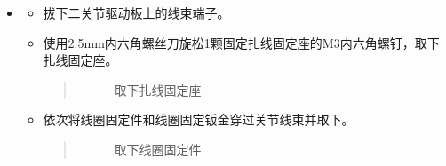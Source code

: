 \documentclass[a4paper,11pt,english,openany,oneside]{sphinxmanual}
\begin{document}
\begin{itemize}
\begin{itemize}
\begin{quote}
\begin{figure}[H]
\noindent{}
\caption{旋松一关节螺钉}\label{\detokenize{_u66f4_u6362_u5173_u8282:id38}}\end{figure}
\end{quote}

\item {} 
\sphinxAtStartPar
缓慢将二关节取下，同时将线束从一关节的出线孔逐一抽出，为防止线束端子卡住，推荐先抽出电源线，再抽出EtherCAT线。
\begin{quote}

\begin{figure}[H]
\centering
\capstart

\noindent{}
\caption{分离二关节}\label{\detokenize{_u66f4_u6362_u5173_u8282:id39}}\end{figure}
\end{quote}

\end{itemize}

\item {} 
\sphinxAtStartPar
{}
\begin{itemize}
\item {} 
\sphinxAtStartPar
拔下二关节驱动板上的线束端子。

\item {} 
\sphinxAtStartPar
使用2.5mm内六角螺丝刀旋松1颗固定扎线固定座的M3内六角螺钉，取下扎线固定座。
\begin{quote}

\begin{figure}[H]
\centering
\capstart

\noindent{}
\caption{取下扎线固定座}\label{\detokenize{_u66f4_u6362_u5173_u8282:id40}}\end{figure}
\end{quote}

\item {} 
\sphinxAtStartPar
依次将线圈固定件和线圈固定钣金穿过关节线束并取下。
\begin{quote}

\begin{figure}[H]
\centering
\capstart

\noindent{}
\caption{取下线圈固定件}\label{\detokenize{_u66f4_u6362_u5173_u8282:id41}}\end{figure}
\end{quote}


\end{itemize}
\end{itemize}
\end{document}
